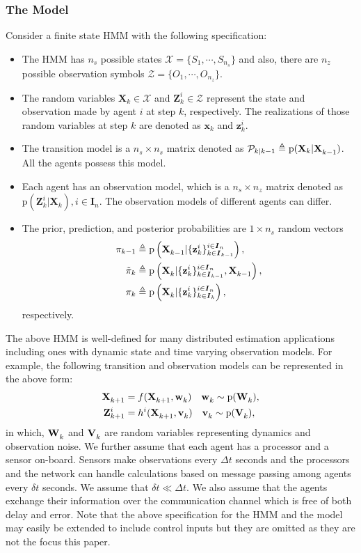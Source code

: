 \documentclass[conference]{IEEEtran}
\newcommand{\vect}[1]{{\mathbf{#1}}}
\theoremstyle{remark}
\newcommand{\XX}[3][2]{\mathbf{X}_{\tiny #2}^{\tiny #3}}
\newcommand{\pr}{\textrm{p}}
\newcommand{\bIn}{\boldsymbol{I}_{{n}}}
\newcommand{\bIk}{\boldsymbol{I}_{{k}}}
\newcommand{\bIkk}{\boldsymbol{I}_{{k-1}}}
\newcommand{\zz}[3][2]{\mathbf{z}_{ #2}^{ #3}}
\newcommand{\ZZ}[3][2]{\mathbf{Z}_{ #2}^{ #3}}
\begin{document}
\subsubsection*{The Model} Consider a finite state HMM with the following specification:
\begin{itemize}
	\item The HMM has $n_s$ possible states $\mathcal{X} = \{S_1,\cdots,S_{n_s}\} $ and also, there are $n_z$ possible observation symbols $\mathcal{Z} = \{O_1,\cdots,O_{n_z}\}$.
	\item The random variables $\vect{X}_k \in \mathcal{X} $ and $ \vect{Z}_k^i \in \mathcal{Z} $ represent the state and observation made by agent $i$ at step $ k $, respectively. The realizations of those random variables at step $k$ are denoted as $\vect{x}_k$ and $\vect{z}_k^i$.    
	\item The transition model is a $n_s\times n_s$ matrix denoted as $\mathcal{P}_{k \vert k-1}\triangleq \pr(\vect{X}_{k} | \XX[]{k-1}{})$. All the agents possess this model.
	\item Each agent has an observation model, which is a $n_s\times n_z$ 
	matrix denoted as $\pr(\vect{Z}_{k}^{i} | \vect{X}_{k}), i\in\bIn$. The 
	observation models of different agents can differ.
	\item The prior, prediction, and posterior probabilities are $1\times n_s$ random vectors
	\begin{align}
		\pi_{k-1}&\triangleq \pr\left(\XX[]{k-1}{}|\{\zz{k}{i}\}^{i\in\bIn}_{k\in\bIkk}\right),\nonumber\\
		\tilde{\pi}_{k}&\triangleq \pr\left(\XX[]{k}{}|\{\zz{k}{i}\}^{i\in\bIn}_{k\in\bIkk},\XX[]{k-1}{}\right),\nonumber\\
		\pi_{k}&\triangleq \pr\left(\XX[]{k}{}|\{\zz{k}{i}\}^{i\in\bIn}_{k\in\bIk}\right),\nonumber
	\end{align}
	respectively.
\end{itemize}
The above HMM is well-defined for many distributed estimation applications including ones with dynamic state and time varying observation models. For example, the following transition and observation models can be represented in the above form:
\begin{align}
\XX[]{k+1}{} &= f(\XX[]{k+1}{},\ais{\vect{w}}{k}{})\quad \ais{\vect{w}}{k}{} \sim \pr(\ais{\vect{W}}{k}{}), \\
\ZZ{k+1}{i} &= h^i(\XX[]{k+1}{},\ais{\vect{v}}{k}{})\quad \ais{\vect{v}}{k}{} \sim \pr(\ais{\vect{V}}{k}{}), 
\end{align}
in which, $\ais{\vect{W}}{k}{}$ and $\ais{\vect{V}}{k}{}$ are random variables representing dynamics and observation noise. We further assume that each agent has a processor and a sensor on-board. Sensors make observations every $\Delta t$ seconds and the processors and the network can handle calculations based on message passing among agents every $\delta t$ seconds. We assume that $\delta t \ll \Delta t$. We also assume that the agents exchange their information over the communication channel which is free of both delay and error. Note that the above specification for the HMM and the model may easily be extended to include control inputs but they are omitted as they are not the focus this paper. 
\end{document}
